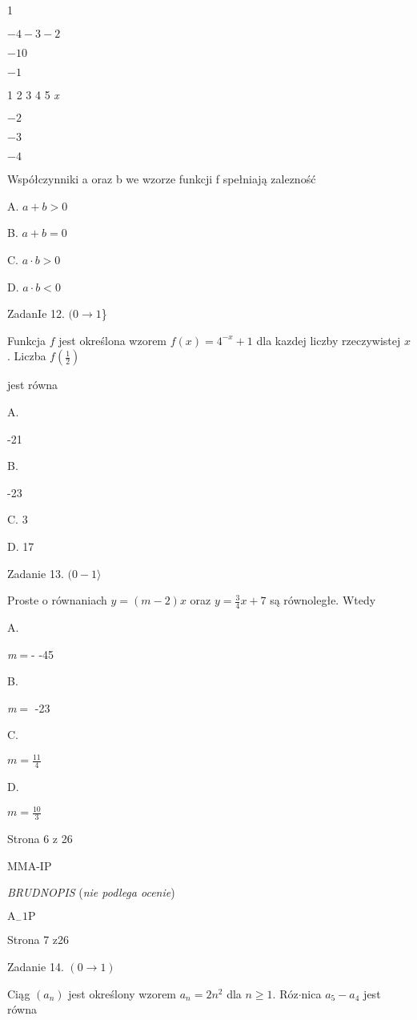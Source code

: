 \documentclass[a4paper,12pt]{article}
\begin{document}
1

$-4 -3  -2$

$-1 0$

$-1$

1 2 3 4  5  {\it x}

$-2$

$-3$

$-4$

Współczynniki a oraz b we wzorze funkcji f spełniają zalezność

A. $a+b>0$

B. $a+b=0$

C. $a\cdot b>0$

D. $a\cdot b<0$

ZadanIe 12. $(0\rightarrow 1$\}

Funkcja $f$ jest określona wzorem $f(x)=4^{-x}+1$ dla kazdej liczby rzeczywistej $x$. Liczba $f(\displaystyle \frac{1}{2})$

jest równa

A.

-21

B.

-23

C. 3

D. 17

Zadanie 13. $(0-1\rangle$

Proste o równaniach $y=(m-2)x$ oraz $y=\displaystyle \frac{3}{4}x+7$ są równoległe. Wtedy

A.

{\it m}$=$- -45

B.

{\it m}$=$ -23

C.

$m=\displaystyle \frac{11}{4}$

D.

$m=\displaystyle \frac{10}{3}$

Strona 6 z 26

MMA-IP





{\it BRUDNOPIS} ({\it nie podlega ocenie})

$\mathrm{A}_{-}1\mathrm{P}$

Strona 7 z26





Zadanie 14. $(0\rightarrow 1)$

Ciąg $(a_{n})$ jest określony wzorem $a_{n}=2n^{2}$ dla $n\geq 1$. Róz$\cdot$nica $a_{5}-a_{4}$ jest równa
\end{document}

